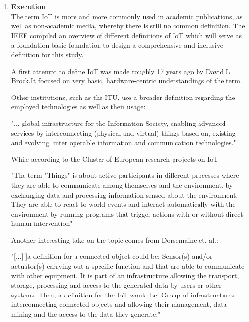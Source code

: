\begin{enumerate}
    \item
    \textbf{Execution}\\
    The term \ac{IoT} is more and more commonly used in academic publications, as well as non-academic media, whereby there is still no common definition. The \ac{IEEE} compiled an overview of different definitions of \ac{IoT} which will serve as a foundation basic foundation to design a comprehensive and inclusive definition for this study.
    
    A first attempt to define \ac{IoT} was made roughly 17 years ago by David L. Brock.It focused on very basic, hardware-centric understandings of the term. 
    
    Other institutions, such as the \ac{ITU}, use a broader definition regarding the employed technologies as well as their usage:
    
    \begin{displayquote}
        "... global infrastructure for the Information Society, enabling advanced services
        by interconnecting (physical and virtual) things based on, existing and
        evolving, inter operable information and communication technologies."\autocite{Wortmann2015InternetThings}
    \end{displayquote}
    
    While according to the Cluster of European research projects on IoT
    
    \begin{displayquote}
        "The term "Things" is about active participants in different processes where
        they are able to communicate among themselves and the environment, by
        exchanging data and processing information sensed about the environment.
        They are able to react to world events and interact automatically with the
        environment by running programs that trigger actions with or without direct
        human intervention"\autocite{Gubbi2013InternetDirections}
    \end{displayquote}
    
    Another interesting take on the topic comes from Dorsemaine et. al.: 
    
    \begin{displayquote}
        "[...] ]a definition for
        a connected object could be: Sensor(s) and/or actuator(s) carrying
        out a specific function and that are able to communicate
        with other equipment. It is part of an infrastructure allowing
        the transport, storage, processing and access to the generated
        data by users or other systems.
        Then, a definition for the IoT would be: Group of infrastructures
        interconnecting connected objects and allowing
        their management, data mining and the access to the data they
        generate."\autocite{Dorsemaine2016InternetTaxonomy}
    \end{displayquote}
    

\end{enumerate}
